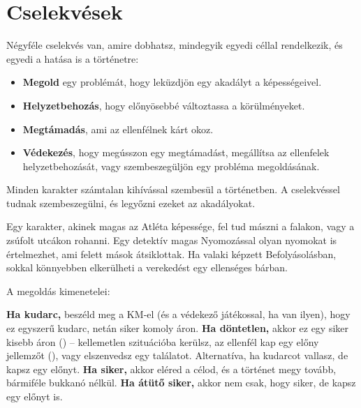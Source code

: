\section{Cselekvések}

Négyféle cselekvés van, amire dobhatsz, mindegyik egyedi céllal rendelkezik, és egyedi a hatása is a történetre:

\begin{itemize}
    \item \textbf{Megold} egy problémát, hogy leküzdjön egy akadályt a képességeivel.
    \item \textbf{Helyzetbehozás}, hogy előnyösebbé változtassa a körülményeket.
    \item \textbf{Megtámadás}, ami az ellenfélnek kárt okoz.
    \item \textbf{Védekezés}, hogy megússzon egy megtámadást, megállítsa az ellenfelek helyzetbehozását, vagy szembeszegüljön egy probléma megoldásának.
\end{itemize}


Minden karakter számtalan kihívással szembesül a történetben. A  cselekvéssel tudnak szembeszegülni, és legyőzni ezeket az akadályokat.

Egy karakter, akinek magas az Atléta képessége, fel tud mászni a falakon, vagy a zsúfolt utcákon rohanni. Egy detektív magas Nyomozással olyan nyomokat is értelmezhet, ami felett mások átsiklottak. Ha valaki képzett Befolyásolásban, sokkal könnyebben elkerülheti a verekedést egy ellenséges bárban.

A megoldás kimenetelei:

\begin{itemize}
    \failureitem \textbf{Ha kudarc,} beszéld meg a KM‑el (és a védekező játékossal, ha van ilyen), hogy ez egyszerű kudarc, netán siker komoly áron.
    \tieitem \textbf{Ha döntetlen,} akkor ez egy siker kisebb áron () – kellemetlen szituációba kerülsz, az ellenfél kap egy előny jellemzőt (), vagy elszenvedsz egy találatot. Alternatíva, ha kudarcot vallasz, de kapsz egy előnyt.
    \successitem \textbf{Ha siker,} akkor eléred a célod, és a történet megy tovább, bármiféle bukkanó nélkül.
    \successwithstyleitem \textbf{Ha átütő siker,} akkor nem csak, hogy siker, de kapsz egy előnyt is.
\end{itemize}


